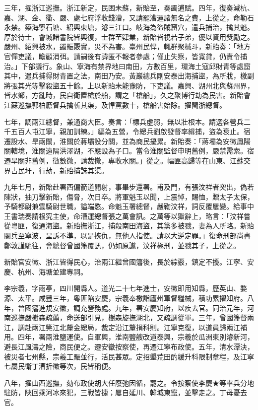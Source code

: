\begin{pinyinscope}
三年，擢浙江巡撫。浙江新定，民困未蘇，新貽至，奏蠲逋賦。四年，復奏減杭、嘉、湖、金、衢、嚴、處七府浮收錢漕，又請罷漕運諸無名之費，上從之，命勒石永禁。築海寧石塘、紹興東塘，濬三江口。岐海為盜賊窟穴，遣兵捕治，擒其魁。厚於待士，會城諸書院皆興復，士群至肄業，新貽皆視若子弟，優以資用獎勵之。嚴州、紹興被水，蠲賑覈實，災不為害。臺州民悍，輒群聚械斗，新貽奏：「地方官憚吏議，瞻顧消弭。請嗣後有諱匿不報者參處；僅止失察，皆寬貸，仍責令捕治。」下部議行。象山、寧海有禁界地曰南田，方數百里，環海土寇邱財青等處窟其中，遣兵捕得財青置之法，南田乃安。黃巖總兵剛安泰出海捕盜，為所戕，檄副將張其光等擊殺盜五十餘。上以新貽未能豫防，下吏議。嘉興、湖州北與蘇州界，皆水鄉，方亂時，民自衛置槍於船，謂之「槍船」，久之聚博行劫為民害。新貽會江蘇巡撫郭柏廕督兵擒斬其渠，及悍黨數十，槍船害始除。擢閩浙總督。

七年，調兩江總督，兼通商大臣。奏言：「標兵虛弱，無以壯根本。請選各營兵二千五百人屯江寧，親加訓練。」編為五營，令總兵劉啟發督率緝捕，盜為衰止。宿遷設水、旱兩關，淮關於蔣壩設分關，並為商民擾累。新貽奏：「蔣壩為安徽鳳陽關轄境，淮關遠隔洪澤湖，不應設為子口。當令淮關監督申明舊例，嚴禁需索。宿遷旱關非舊例，徵數微，請裁撤，專收水關。」從之。幅匪高歸等在山東、江蘇交界占民圩，行劫，新貽捕誅其渠。

九年七月，新貽赴署西偏箭道閱射，事畢步還署。甫及門，有張汶祥者突出，偽若陳狀，抽刀擊新貽，傷脅，次日卒。將軍魁玉以聞，上震悼，賜恤，贈太子太保，予騎都尉兼雲騎尉世職，謚端愍。命魁玉署總督，嚴鞫汶祥，詞反覆屢變。給事中王書瑞奏請根究主使，命漕運總督張之萬會訊。之萬等以獄辭上，略言：「汶祥嘗從粵匪，復通海盜。新貽撫浙江，捕殺南田海盜，其黨多被戮，妻為人所略。新貽閱兵至寧波，呈訴不準，以是挾仇，無他人指使。請以大逆定罪。」復命刑部尚書鄭敦謹馳往，會總督曾國籓覆訊，仍如原讞，汶祥極刑，並戮其子，上從之。

新貽官安徽、浙江皆得民心，治兩江繼曾國籓後，長於綜覈，鎮定不擾。江寧、安慶、杭州、海塘並建專祠。

李宗羲，字雨亭，四川開縣人。道光二十七年進士，安徽即用知縣，歷英山、婺源、太平。咸豐三年，粵匪陷安慶，宗羲奉檄詣廬州軍督糧械，積功累擢知府。八年，曾國籓進規安徽，調充營務處。九年，署安慶知府，以疾去官。同治元年，河南巡撫嚴樹森疏薦，命送部引見，樹森旋撫湖北，又疏調從軍。三年，曾國籓督兩江，調赴兩江筦江北釐金總局，裁定沿江釐捐科則。江寧克復，以道員歸兩江補用。四年，署兩淮鹽運使。自軍興，淮南鹽艘改道泰興，宗羲於瓜洲東別濬新河，避長江風濤之險，商民便之。遷安徽按察使，再遷江寧布政使。五年，清水潭決，被災者七州縣，宗羲工賑並行，活民甚眾。定招墾荒田酌緩升科限制章程，及江寧七屬民衛丁漕折徵等次，民皆稱便。

八年，擢山西巡撫，劾布政使胡大任廢弛因循，罷之。令按察使李慶★等率兵分地駐防，陜回乘河冰來犯，三戰皆捷；屢自延川、韓城東竄，並擊走之。丁母憂去官。


\end{pinyinscope}
